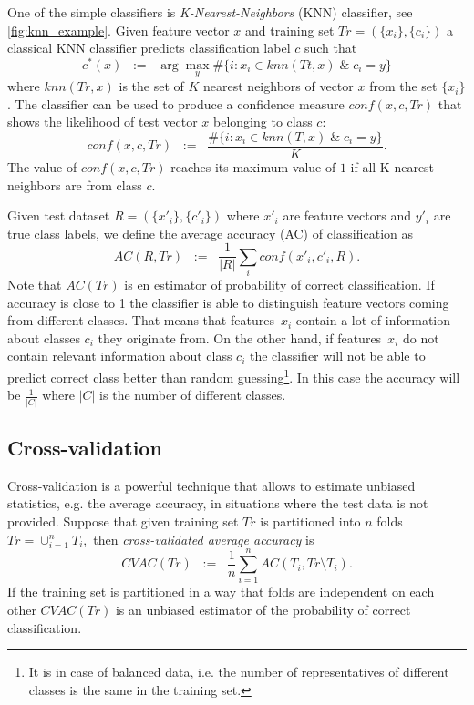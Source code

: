 One of the simple classifiers is \emph{ K-Nearest-Neighbors} (KNN) classifier, see \autoref{fig:knn_example}.
Given feature vector $x$ and training set $Tr=(\{x_i\},\{c_i\})$ a classical KNN classifier predicts classification label $c$ such that 
$$c^*(x)\;\; := \;\; \arg\max_y \#\{i : x_i \in knn(Tt,x) \;\&\; c_i=y \}$$ where $knn(Tr,x)$ is the set of $K$ nearest neighbors of vector $x$ from the set $\{x_i\}$. The classifier can be used to produce a confidence measure $conf(x,c,Tr)$ that shows the likelihood of test vector $x$ belonging to class $c$:
 $$ conf(x,c,Tr) \;\; := \;\; \frac{\#\{i : x_i \in knn(T,x) \;\&\; c_i=y \}}{K}. $$ The value of $conf(x,c,Tr)$ reaches its maximum value of $1$ if all K nearest neighbors are from class $c$. %

Given test dataset $R=(\{x'_i\},\{c'_i\})$ where $x'_i$ are feature vectors and $y'_i$ are true class labels, we define the average accuracy (AC) of classification as 
\begin{equation}
AC(R,Tr) \;\; := \;\; \frac1{|R|}\sum_i conf(x'_i, c'_i,R).
\label{eq:ac}
\end{equation}
Note that $AC(Tr)$ is en estimator of probability of correct classification. If accuracy is close to 1 the classifier is able to distinguish feature vectors coming from different classes. That means that features~$x_i$ contain a lot of information about classes $c_i$ they originate from. On the other hand, if features~$x_i$ do not contain relevant information about class $c_i$ the classifier will not be able to predict correct class better than random guessing\footnote{It is in case of balanced data, i.e. the number of representatives of different classes is the same in the training set.}. In this case the accuracy will be $\frac1{|C|}$ where $|C|$ is the number of different classes. 

\subsection{Cross-validation}

\newcommand{\CVAC}{CV\!\!AC}

Cross-validation is a powerful technique that allows to estimate unbiased statistics, e.g. the average accuracy, in situations where the test data is not provided. Suppose that given training set $Tr$ is partitioned into $n$ folds $Tr=\cup_{i=1}^n T_i,$ then \emph{cross-validated average accuracy} is $$\CVAC(Tr) \;\; := \;\; \frac1n\sum_{i=1}^n AC(T_i,Tr \setminus T_i).$$ If the training set is partitioned in a way that folds are independent on each other $\CVAC(Tr)$ is an unbiased estimator of the probability of correct classification.


